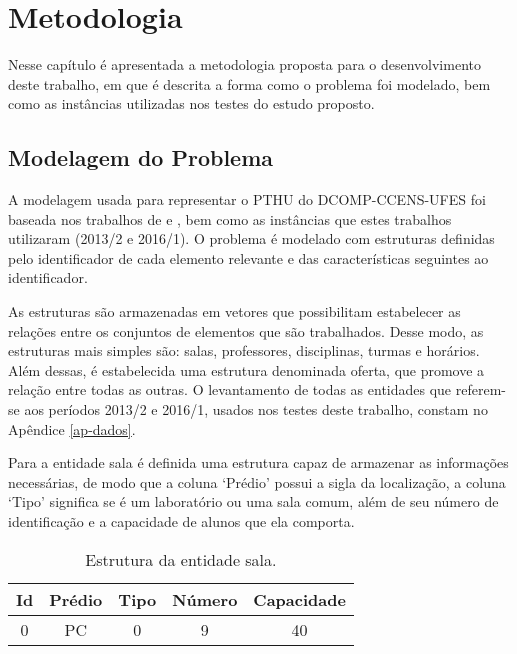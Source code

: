 \chapter{Metodologia}
\label{sec-metodologia}
Nesse capítulo é apresentada a metodologia proposta para o desenvolvimento deste trabalho, em que é descrita a forma como o problema foi modelado, bem como as instâncias utilizadas nos testes do estudo proposto. 

\section{Modelagem do Problema}
\label{sec-met-modelagem}
A modelagem usada para representar o PTHU do DCOMP-CCENS-UFES foi baseada nos trabalhos de  e , bem como as instâncias que estes trabalhos utilizaram (2013/2 e 2016/1). O problema é modelado com estruturas definidas pelo identificador de cada elemento relevante e das características seguintes ao identificador.

As estruturas são armazenadas em vetores que possibilitam estabelecer as relações entre os conjuntos de elementos que são trabalhados. Desse modo, as estruturas mais simples são: salas, professores, disciplinas, turmas e horários. Além dessas, é estabelecida uma estrutura denominada oferta, que promove a relação entre todas as outras. O levantamento de todas as entidades que referem-se aos períodos 2013/2 e 2016/1, usados nos testes deste trabalho, constam no Apêndice \ref{ap-dados}.

Para a entidade sala é definida uma estrutura capaz de armazenar as informações necessárias, de modo que a coluna ‘Prédio’ possui a sigla da localização, a coluna ‘Tipo’ significa se é um laboratório ou uma sala comum, além de seu número de identificação e a capacidade de alunos que ela comporta.


\begin{table}[h!]
\centering
\begin{tabular}{ | c | c | c | c | c |}\hline
\textbf{Id} & \textbf{Prédio} & \textbf{Tipo} & \textbf{Número} & \textbf{Capacidade}\\\hline
0 & PC & 0 & 9 & 40\\\hline
\end{tabular}
\caption{Estrutura da entidade sala.}
\label{tbl-met-sala}
\end{table}

